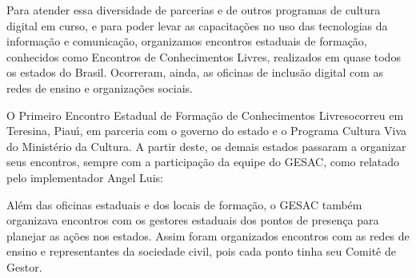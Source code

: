 \documentclass[
12pt,		%
openright,	%
twoside,  %
a4paper,			%
chapter=TITLE,		%
english,			%
french,				%
spanish,			%
brazil				%
]{USPSC-classe/USPSC}
\begin{document}
Para atender essa diversidade de parcerias e de outros programas de cultura digital em curso, e para poder levar as capacita\c{c}\~oes no uso das tecnologias da informa\c{c}\~ao e comunica\c{c}\~ao, organizamos encontros estaduais de forma\c{c}\~ao, conhecidos como \textquotedbl Encontros de Conhecimentos Livres\textquotedbl , realizados em  quase todos os estados do Brasil. Ocorreram, ainda, as  oficinas de inclus\~ao digital com as redes de ensino e organiza\c{c}\~oes sociais.








O \textquotedbl Primeiro Encontro Estadual de Forma\c{c}\~ao de Conhecimentos Livres\textquotedbl  ocorreu em  Teresina, Piau\'{\i}, em parceria com o governo do estado e o Programa Cultura Viva do Minist\'erio da Cultura. A partir deste, os demais estados passaram a organizar seus encontros, sempre com a participa\c{c}\~ao da equipe do GESAC, como relatado pelo implementador Angel Luis:









\noindent\begin{center}\mbox{\centering{}}\end{center}


Al\'em das oficinas estaduais e dos locais de forma\c{c}\~ao, o GESAC tamb\'em organizava encontros com os gestores estaduais dos pontos de presen\c{c}a para planejar as a\c{c}\~oes nos estados. Assim foram organizados encontros com as redes de ensino e  representantes da sociedade civil, pois cada ponto  tinha seu Comit\^e de Gestor.
\end{document}
